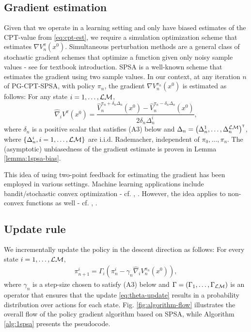 \documentclass[11pt,letterpaper,english]{article}
\begin{document}
\subsection{Gradient estimation} 
Given that we operate in a learning setting and only have biased estimates of the CPT-value from \eqref{eq:cpt-est}, we require a simulation optimization scheme that estimates $\nabla V_n^\pi(x^0)$.  
Simultaneous perturbation methods are a general class of stochastic gradient schemes that optimize a function given only noisy sample values - see \cite{Bhatnagar13SR} for textbook introduction. SPSA is a well-known scheme that estimates the gradient using two sample values. In our context, at any iteration $n$ of PG-CPT-SPSA, with policy $\pi_n$, the gradient $\nabla V_n^{\pi_n}(x^0)$ is estimated as follows: For any state $i=1,\ldots,\mathcal{L}\mathcal{M}$,
$$\widehat \nabla_{i} V^\pi(x^0) = \dfrac{\widehat V_n^{\pi_n+\delta_n \Delta_n}(x^0) - \widehat V_n^{\pi_n-\delta_n \Delta_n}(x^0)}{2 \delta_n \Delta_n^{i}},$$
where $\delta_n$ is a positive scalar that satisfies (A3) below and $\Delta_n = \left( \Delta_n^{1},\ldots,\Delta_n^{\mathcal{L}\mathcal{M}}\right)^\mathsf{\scriptscriptstyle T}$, where $\{\Delta_n^{i}, i=1,\ldots,\mathcal{L}\mathcal{M}\}$ are i.i.d. Rademacher, independent of $\pi_0,\ldots,\pi_n$.
The (asymptotic) unbiasedness of the gradient estimate is proven in Lemma \ref{lemma:1spsa-bias}.

This idea of using two-point feedback for estimating the gradient has been employed in various settings. Machine learning applications include bandit/stochastic convex optimization - cf. 
\cite{hazan2015online}, \cite{duchi2013optimal}. However, the idea applies to non-convex functions as well - cf. \cite{spall2005introduction}, \cite{Bhatnagar13SR}.


\subsection{Update rule} We incrementally update the policy in the descent direction as follows: For every state $i=1,\ldots,\mathcal{L}\mathcal{M}$,
\begin{align}
\pi^{i}_{n+1} = \Gamma_{i}\left(\pi^{i}_n - \gamma_n \widehat \nabla_{i} V_n^{\pi_n}(x^0)\right),
\label{eq:theta-update}
\end{align}
where  $\gamma_n$ is a step-size chosen to satisfy (A3) below and
$\Gamma=\left(\Gamma_{1},\ldots,\Gamma_{\mathcal{L}\mathcal{M}}\right)$ is an operator that ensures that the update \eqref{eq:theta-update} results in a probability distribution over actions for each state. 
Fig. \ref{fig:algorithm-flow} illustrates the overall flow of the policy gradient algorithm based on SPSA, while Algorithm \ref{alg:1spsa}  presents the pseudocode.  
\end{document}
